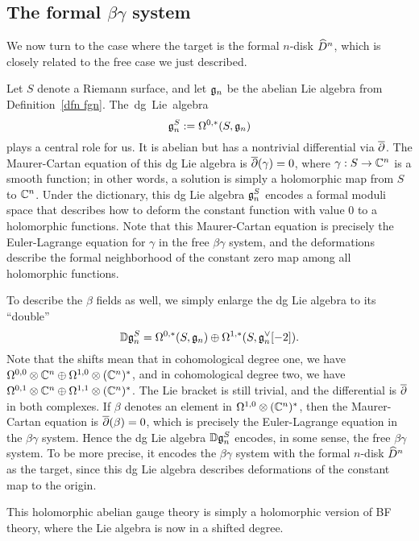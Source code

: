 \subsection{The formal $\beta\gamma$ system}

We now turn to the case where the target is the formal $n$-disk $\widehat{D}^n$,
which is closely related to the free case we just described.

Let $S$ denote a Riemann surface, and let $\mathfrak g_n$ be the abelian Lie algebra from Definition~\ref{dfn fgn}. \si 
The dg Lie algebra $$\mathfrak g_n^S := \Omega^{0,*}(S,\mathfrak g_n)$$ plays a central role for us.
It is abelian but has a nontrivial differential via $\overline{\partial}$.
The Maurer-Cartan equation of this dg Lie algebra is $\overline{\partial}(\gamma) = 0$, where $\gamma: S \to \mathbb C^n$ is a smooth function;
in other words, a solution is simply a holomorphic map from $S$ to $\mathbb C^n$.
Under the dictionary, this dg Lie algebra $\mathfrak g^S_n$ encodes a formal moduli space that describes how to deform the constant function with value $0$ to a holomorphic functions.
Note that this Maurer-Cartan equation is precisely the Euler-Lagrange equation for $\gamma$ in the free $\beta\gamma$ system,
and the deformations describe the formal neighborhood of the constant zero map among all holomorphic functions.

To describe the $\beta$ fields as well, we simply enlarge the dg Lie algebra to its ``double''
\[
\mathbb D \mathfrak g_n^S = \Omega^{0,*}(S, \mathfrak g_n) \oplus \Omega^{1,*}(S, \mathfrak g_n^\vee[-2]).
\]
Note that the shifts mean that in cohomological degree one, we have $\Omega^{0,0} \otimes \mathbb C^n \oplus \Omega^{1,0} \otimes (\mathbb C^n)^*$, 
and in cohomological degree two, we have $\Omega^{0,1} \otimes \mathbb C^n \oplus \Omega^{1,1} \otimes (\mathbb C^n)^*$.
The Lie bracket is still trivial, and the differential is $\overline{\partial}$ in both complexes. 
If $\beta$ denotes an element in $\Omega^{1,0} \otimes (\mathbb C^n)^*$,
then the Maurer-Cartan equation is $\overline{\partial}(\beta) = 0$, which is precisely the Euler-Lagrange equation in the $\beta\gamma$ system.
Hence the dg Lie algebra $\mathbb D \mathfrak g_n^S$ encodes, in some sense, the free $\beta\gamma$ system.
To be more precise, it encodes the $\beta\gamma$ system with the formal $n$-disk $\widehat{D}^n$ as the target,
since this dg Lie algebra describes deformations of the constant map to the origin.

\begin{rmk}
This holomorphic abelian gauge theory is simply a holomorphic version of BF theory, where the Lie algebra is now in a shifted degree.
\end{rmk}

